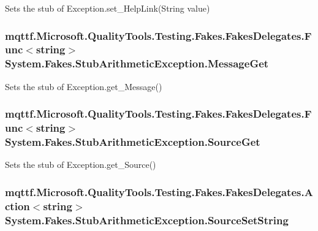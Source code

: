 Sets the stub of Exception.\-set\-\_\-\-Help\-Link(\-String value)

\hypertarget{class_system_1_1_fakes_1_1_stub_arithmetic_exception_abcaf99bbf5861f91d767bb9ee35b96c8}{
\subsubsection[{Message\-Get}]{\setlength{\rightskip}{0pt plus 5cm}mqttf.\-Microsoft.\-Quality\-Tools.\-Testing.\-Fakes.\-Fakes\-Delegates.\-Func$<$string$>$ System.\-Fakes.\-Stub\-Arithmetic\-Exception.\-Message\-Get}}\label{class_system_1_1_fakes_1_1_stub_arithmetic_exception_abcaf99bbf5861f91d767bb9ee35b96c8}


Sets the stub of Exception.\-get\-\_\-\-Message()

\hypertarget{class_system_1_1_fakes_1_1_stub_arithmetic_exception_aaf5827167fc1cf5f512d96141c01405f}{
\subsubsection[{Source\-Get}]{\setlength{\rightskip}{0pt plus 5cm}mqttf.\-Microsoft.\-Quality\-Tools.\-Testing.\-Fakes.\-Fakes\-Delegates.\-Func$<$string$>$ System.\-Fakes.\-Stub\-Arithmetic\-Exception.\-Source\-Get}}\label{class_system_1_1_fakes_1_1_stub_arithmetic_exception_aaf5827167fc1cf5f512d96141c01405f}


Sets the stub of Exception.\-get\-\_\-\-Source()

\hypertarget{class_system_1_1_fakes_1_1_stub_arithmetic_exception_aa0bcd8de94e8de4223bad787a97d86d3}{
\subsubsection[{Source\-Set\-String}]{\setlength{\rightskip}{0pt plus 5cm}mqttf.\-Microsoft.\-Quality\-Tools.\-Testing.\-Fakes.\-Fakes\-Delegates.\-Action$<$string$>$ System.\-Fakes.\-Stub\-Arithmetic\-Exception.\-Source\-Set\-String}}\label{class_system_1_1_fakes_1_1_stub_arithmetic_exception_aa0bcd8de94e8de4223bad787a97d86d3}


